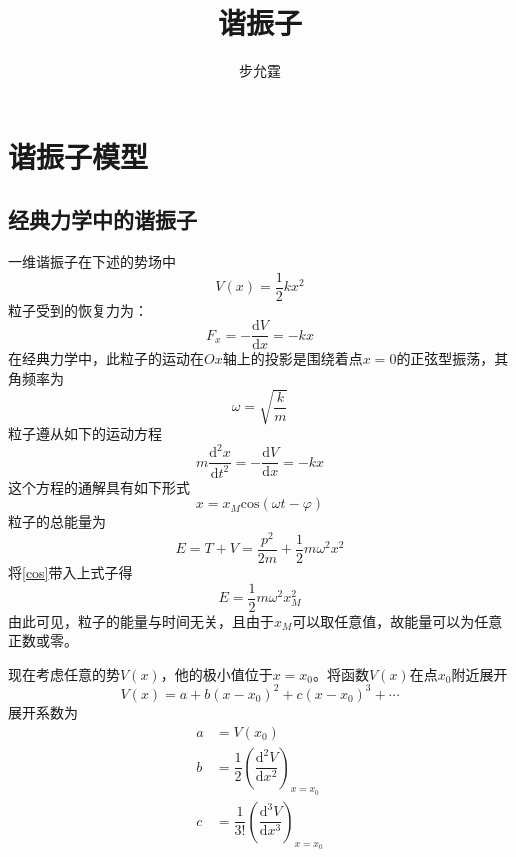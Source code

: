 \documentclass[]{article}
\title{谐振子}
\author{步允霆}
\begin{document}
	
	\maketitle
\tableofcontents
\section{谐振子模型}
\subsection{经典力学中的谐振子}
一维谐振子在下述的势场中
\begin{equation}
	V(x)=\dfrac{1}{2}kx^2
\end{equation}
粒子受到的恢复力为：
\begin{equation}
	F_x=-\dfrac{\mathrm{d}V}{\mathrm{d}x}=-kx
\end{equation}
在经典力学中，此粒子的运动在$Ox$轴上的投影是围绕着点$x=0$的正弦型振荡，其角频率为
\begin{equation}
	\omega=\sqrt{\dfrac{k}{m}}
\end{equation}
粒子遵从如下的运动方程
\begin{equation}
	m\dfrac{\mathrm{d}^2x}{\mathrm{d}t^2}=-\dfrac{\mathrm{d}V}{\mathrm{d}x}=-kx
\end{equation}
这个方程的通解具有如下形式
\begin{equation}
	x=x_M\mathrm{cos}(\omega t-\varphi)
	\label{cos}
\end{equation}
粒子的总能量为
\begin{equation}
	E=T+V=\dfrac{p^2}{2m}+\dfrac{1}{2}m\omega^2x^2
\end{equation}
将\eqref{cos}带入上式子得
\begin{equation}
	E=\dfrac{1}{2}m\omega^2x_M^2
\end{equation}
由此可见，粒子的能量与时间无关，且由于$x_M$可以取任意值，故能量可以为任意正数或零。\par 
现在考虑任意的势$V(x)$，他的极小值位于$x=x_0$。将函数$V(x)$在点$x_0$附近展开
\begin{equation}
	V(x)=a+b(x-x_0)^2+c(x-x_0)^3+\cdots
\end{equation}
展开系数为
\begin{align}
	a&=V(x_0)\nonumber\\
	b&=\dfrac{1}{2}\left(\dfrac{\mathrm{d}^2V}{\mathrm{d}x^2} \right) _{x=x_0}\nonumber\\
	c&=\dfrac{1}{3!}\left(\dfrac{\mathrm{d}^3V}{\mathrm{d}x^3} \right) _{x=x_0}
\end{align}
\end{document}
